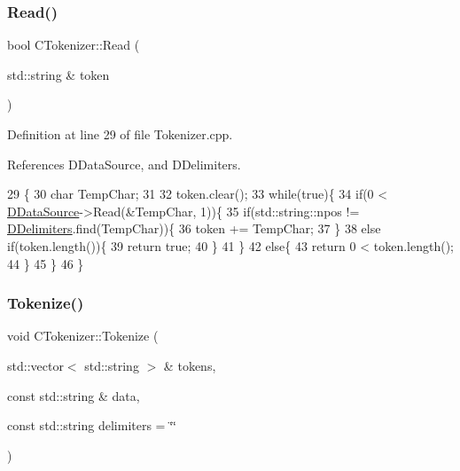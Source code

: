 \subsubsection{\texorpdfstring{Read()}{Read()}}
{\footnotesize\ttfamily bool C\+Tokenizer\+::\+Read (\begin{DoxyParamCaption}\item[{std\+::string \&}]{token }\end{DoxyParamCaption})}



Definition at line 29 of file Tokenizer.\+cpp.



References D\+Data\+Source, and D\+Delimiters.


\begin{DoxyCode}
29                                      \{
30     \textcolor{keywordtype}{char} TempChar;
31     
32     token.clear();
33     \textcolor{keywordflow}{while}(\textcolor{keyword}{true})\{
34         \textcolor{keywordflow}{if}(0 < \hyperlink{classCTokenizer_aaa6faab432000d3f942a0c14fc09f60b}{DDataSource}->Read(&TempChar, 1))\{
35             \textcolor{keywordflow}{if}(std::string::npos != \hyperlink{classCTokenizer_ad1edcf297f5f9ccf43dc32a992556f52}{DDelimiters}.find(TempChar))\{
36                 token += TempChar;
37             \}
38             \textcolor{keywordflow}{else} \textcolor{keywordflow}{if}(token.length())\{
39                 \textcolor{keywordflow}{return} \textcolor{keyword}{true};
40             \}
41         \}
42         \textcolor{keywordflow}{else}\{
43             \textcolor{keywordflow}{return} 0 < token.length();
44         \}
45     \}
46 \}
\end{DoxyCode}
\hypertarget{classCTokenizer_a7477f6849a3d0a5154879d8622e4012c}{}\label{classCTokenizer_a7477f6849a3d0a5154879d8622e4012c} 
\subsubsection{\texorpdfstring{Tokenize()}{Tokenize()}}
{\footnotesize\ttfamily void C\+Tokenizer\+::\+Tokenize (\begin{DoxyParamCaption}\item[{std\+::vector$<$ std\+::string $>$ \&}]{tokens,  }\item[{const std\+::string \&}]{data,  }\item[{const std\+::string}]{delimiters = {\ttfamily \char`\"{}\char`\"{}} }\end{DoxyParamCaption})\hspace{0.3cm}{\ttfamily [static]}}




